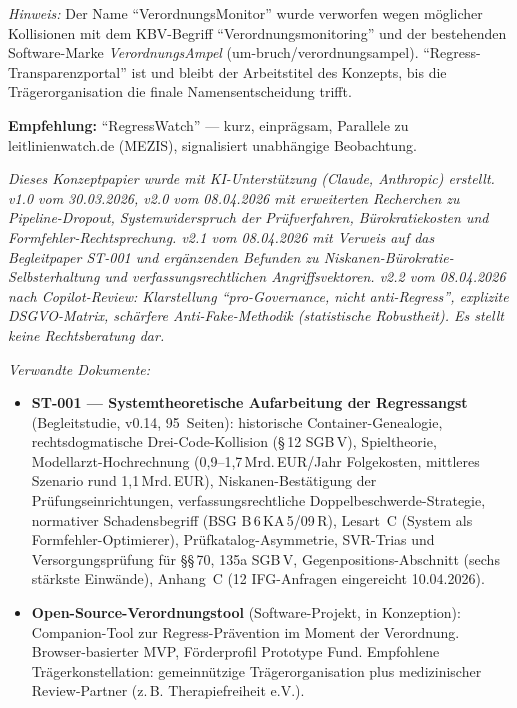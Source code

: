 \documentclass{umbruch-position}
\begin{document}
\textit{Hinweis:} Der Name ``VerordnungsMonitor'' wurde verworfen wegen möglicher Kollisionen mit dem KBV-Begriff ``Verordnungsmonitoring'' und der bestehenden Software-Marke \emph{VerordnungsAmpel} (um-bruch/verordnungsampel). ``Regress-Transparenzportal'' ist und bleibt der Arbeitstitel des Konzepts, bis die Trägerorganisation die finale Namensentscheidung trifft.

\textbf{Empfehlung:} ``RegressWatch'' --- kurz, einprägsam, Parallele zu leitlinienwatch.de (MEZIS), signalisiert unabhängige Beobachtung.


\emph{Dieses Konzeptpapier wurde mit KI-Unterstützung (Claude, Anthropic) erstellt. v1.0 vom 30.03.2026, v2.0 vom 08.04.2026 mit erweiterten Recherchen zu Pipeline-Dropout, Systemwiderspruch der Prüfverfahren, Bürokratiekosten und Formfehler-Rechtsprechung. v2.1 vom 08.04.2026 mit Verweis auf das Begleitpaper ST-001 und ergänzenden Befunden zu Niskanen-Bürokratie-Selbsterhaltung und verfassungsrechtlichen Angriffsvektoren. v2.2 vom 08.04.2026 nach Copilot-Review: Klarstellung ``pro-Governance, nicht anti-Regress'', explizite DSGVO-Matrix, schärfere Anti-Fake-Methodik (statistische Robustheit). Es stellt keine Rechtsberatung dar.}

\vspace{0.5em}

\emph{Verwandte Dokumente:}
\begin{itemize}[nosep]
  \item \textbf{ST-001 --- Systemtheoretische Aufarbeitung der Regressangst} (Begleitstudie, v0.14, 95~Seiten): historische Container-Genealogie, rechtsdogmatische Drei-Code-Kollision (\S\,12 SGB\,V), Spieltheorie, Modellarzt-Hochrechnung (0,9--1,7\,Mrd.\,EUR/Jahr Folgekosten, mittleres Szenario rund 1,1\,Mrd.\,EUR), Niskanen-Best\"atigung der Pr\"ufungseinrichtungen, verfassungsrechtliche Doppelbeschwerde-Strategie, normativer Schadensbegriff (BSG B\,6\,KA\,5/09\,R), Lesart~C (System als Formfehler-Optimierer), Pr\"ufkatalog-Asymmetrie, SVR-Trias und Versorgungspr\"ufung f\"ur \S\S\,70, 135a SGB\,V, Gegenpositions-Abschnitt (sechs st\"arkste Einw\"ande), Anhang~C (12 IFG-Anfragen eingereicht 10.04.2026).
  \item \textbf{Open-Source-Verordnungstool} (Software-Projekt, in Konzeption): Companion-Tool zur Regress-Prävention im Moment der Verordnung. Browser-basierter MVP, Förderprofil Prototype Fund. Empfohlene Trägerkonstellation: gemeinnützige Trägerorganisation plus medizinischer Review-Partner (z.\,B. Therapiefreiheit e.V.).
\end{itemize}
\end{document}
